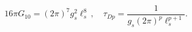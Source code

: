 \begin{equation}\label{Newton}
16\pi G_{10}= (2\pi)^{7}g_{s}^{2}\ell_{s}^{8}\,,\quad
\tau_{Dp}={\frac{1}{g_{s}(2\pi)^{p}\ell_{s}^{p+1}}}.
\end{equation}

